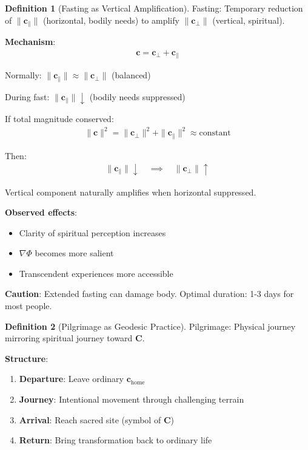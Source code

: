 \documentclass[11pt,a4paper]{article}
\theoremstyle{definition}
\newtheorem{definition}{Definition}[section]
\theoremstyle{remark}
\newcommand{\cc}{\mathbf{c}}
\begin{document}
\begin{small}
\begin{enumerate}
\begin{protocol}
\begin{definition}[Fasting as Vertical Amplification]
Fasting: Temporary reduction of \(\|\cc_\parallel\|\) (horizontal, bodily needs) to amplify \(\|\cc_\perp\|\) (vertical, spiritual).

\textbf{Mechanism}:
\begin{align}
\cc = \cc_\perp + \cc_\parallel
\end{align}

Normally: \(\|\cc_\parallel\| \approx \|\cc_\perp\|\) (balanced)

During fast: \(\|\cc_\parallel\| \downarrow\) (bodily needs suppressed)

If total magnitude conserved:
\begin{align}
\|\cc\|^2 = \|\cc_\perp\|^2 + \|\cc_\parallel\|^2 \approx \text{constant}
\end{align}

Then:
\begin{align}
\|\cc_\parallel\| \downarrow \quad \implies \quad \|\cc_\perp\| \uparrow
\end{align}

Vertical component naturally amplifies when horizontal suppressed.

\textbf{Observed effects}:
\begin{itemize}
    \item Clarity of spiritual perception increases
    \item \(\nabla \Phi\) becomes more salient
    \item Transcendent experiences more accessible
\end{itemize}

\textbf{Caution}: Extended fasting can damage body. Optimal duration: 1-3 days for most people.
\end{definition}

\begin{definition}[Pilgrimage as Geodesic Practice]
Pilgrimage: Physical journey mirroring spiritual journey toward \(\mathbf{C}\).

\textbf{Structure}:
\begin{enumerate}
    \item \textbf{Departure}: Leave ordinary \(\cc_{\text{home}}\)
    \item \textbf{Journey}: Intentional movement through challenging terrain
    \item \textbf{Arrival}: Reach sacred site (symbol of \(\mathbf{C}\))
    \item \textbf{Return}: Bring transformation back to ordinary life
\end{enumerate}


\end{definition}
\end{protocol}
\end{enumerate}
\end{small}
\end{document}
